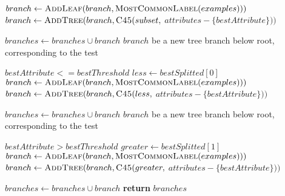 \begin{algorithm}[H]
\begin{algorithmic}[1]
              \State $branch \gets \textsc{AddLeaf}(branch, \textsc{MostCommonLabel}(examples)))$
          \Else
              \State $branch \gets \textsc{AddTree}(branch, \textsc{C45}(subset,$ $attributes - \{bestAttribute\}))$\par\hfill
          \EndIf
          \State $branches \gets branches \cup branch$
      \EndFor
    \Else
       $branch$ {\small be a new tree branch below root, corresponding to the test}  \par\hfill $bestAttribute <= bestThreshold$
      \State $less \gets bestSplitted[0]$
          \State $branch \gets \textsc{AddLeaf}(branch, \textsc{MostCommonLabel}(examples)))$
      \Else
          \State $branch \gets \textsc{AddTree}(branch, \textsc{C45}(less,$ $attributes - \{bestAttribute\}))$\par\hfill
      \EndIf
      \State $branches \gets branches \cup branch$
       $branch$ {\small be a new tree branch below root, corresponding to the test}  \par\hfill $bestAttribute > bestThreshold$
      \State $greater \gets bestSplitted[1]$
          \State $branch \gets \textsc{AddLeaf}(branch, \textsc{MostCommonLabel}(examples)))$
      \Else
          \State $branch \gets \textsc{AddTree}(branch, \textsc{C45}(greater,$ $attributes - \{bestAttribute\}))$\par\hfill
      \EndIf
      \State $branches \gets branches \cup branch$
    \EndIf
    \State \textbf{return} $branches$
\EndProcedure
\end{algorithmic}
\end{algorithm}

